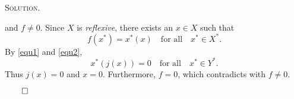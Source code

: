 \documentclass[12pt, a4paper, oneside]{ctexart}
\newenvironment{solution}{%
	\par\noindent\textsc{Solution. }\ignorespaces
}{%
	\hfill$\qed$\par
}
\begin{document}
\begin{solution}
\begin{enumerate}[(i)]
			and \( f \neq 0 \). Since \( X \) is \textit{reflexive}, there exists an \( x \in X \) such that  
			\[
			f(x^*) =  x^*(x) \quad \text{for all} \quad x^* \in X^*.
			\]
			By \eqref{equ1} and \eqref{equ2},  
			\[
			x^*(j(x)) = 0 \quad \text{for all} \quad x^* \in Y^*.
			\]Thus $j(x) = 0$ and $x = 0$. Furthermore, $f = 0$, which contradicts with $f\neq0$.
		\end{enumerate}
	\end{solution}
	
\end{document}
